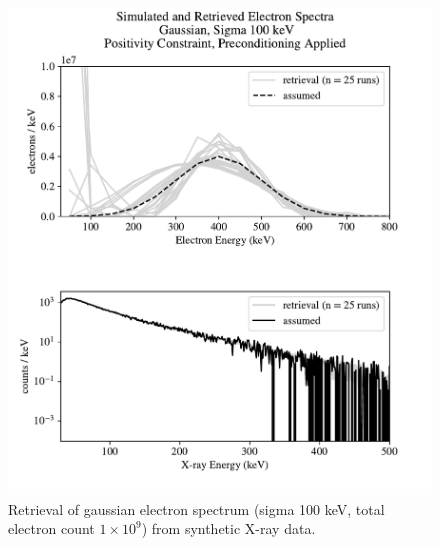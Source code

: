 \begin{figure}[p]
    \centering
    \includegraphics[width=\textwidth]{figures/chapter_4/synthetic_data_examples/gauss_100keV_posonly_preconditioning_1e9_particles}
    \caption{Retrieval of gaussian electron spectrum (sigma 100 keV, total electron count $1\times10^9$) from synthetic X-ray data.}
    \label{why_non_negative_is_good}
\end{figure}

